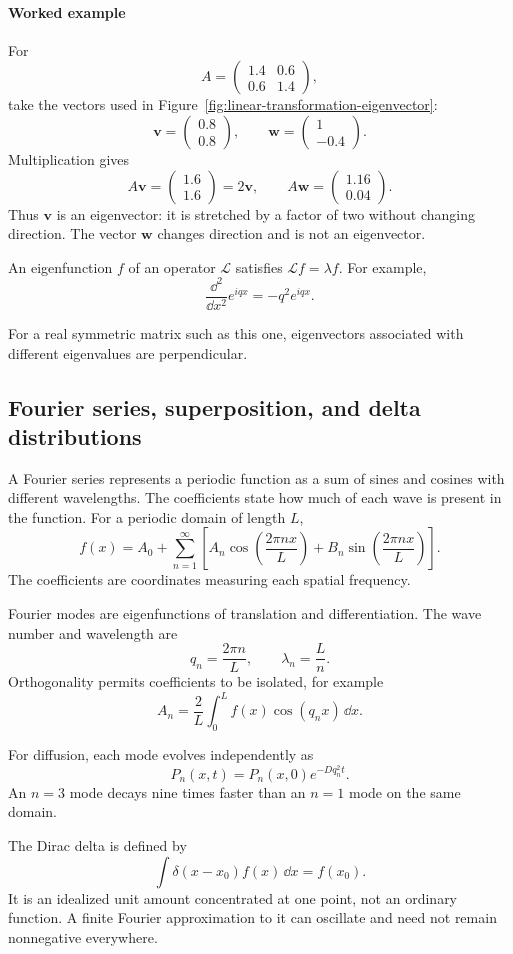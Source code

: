 \paragraph{Worked example}
For
\[
    A=\begin{pmatrix}1.4&0.6\\0.6&1.4\end{pmatrix},
\]
take the vectors used in Figure~\ref{fig:linear-transformation-eigenvector}:
\[
    \mathbf{v}=\begin{pmatrix}0.8\\0.8\end{pmatrix}, \qquad \mathbf{w}=\begin{pmatrix}1\\-0.4\end{pmatrix}.
\]
Multiplication gives
\[
    A\mathbf{v}=\begin{pmatrix}1.6\\1.6\end{pmatrix}=2\mathbf{v}, \qquad A\mathbf{w}=\begin{pmatrix}1.16\\0.04\end{pmatrix}.
\]
Thus $\mathbf{v}$ is an eigenvector: it is stretched by a factor of two without changing direction.
The vector $\mathbf{w}$ changes direction and is not an eigenvector.

An eigenfunction $f$ of an operator $\mathcal{L}$ satisfies $\mathcal{L}f=\lambda f$.
For example,
\[
    \frac{\dd^2}{\dd x^2}e^{iqx}=-q^2e^{iqx}.
\]

For a real symmetric matrix such as this one, eigenvectors associated with different eigenvalues are perpendicular.


\subsection{Fourier series, superposition, and delta distributions}
\label{math:fourier}

A Fourier series represents a periodic function as a sum of sines and cosines with different wavelengths.
The coefficients state how much of each wave is present in the function.
For a periodic domain of length $L$,
\[
    f(x)=A_0+\sum_{n=1}^{\infty}\left[A_n\cos\left(\frac{2\pi nx}{L}\right)+B_n\sin\left(\frac{2\pi nx}{L}\right)\right].
\]
The coefficients are coordinates measuring each spatial frequency.

Fourier modes are eigenfunctions of translation and differentiation.
The wave number and wavelength are
\[
    q_n=\frac{2\pi n}{L}, \qquad \lambda_n=\frac{L}{n}.
\]
Orthogonality permits coefficients to be isolated, for example
\[
    A_n=\frac{2}{L}\int_0^Lf(x)\cos(q_nx)\,\dd x.
\]

For diffusion, each mode evolves independently as
\[
    P_n(x,t)=P_n(x,0)e^{-Dq_n^2t}.
\]
An $n=3$ mode decays nine times faster than an $n=1$ mode on the same domain.

The Dirac delta is defined by
\[
    \int\delta(x-x_0)f(x)\,\dd x=f(x_0).
\]
It is an idealized unit amount concentrated at one point, not an ordinary function.
A finite Fourier approximation to it can oscillate and need not remain nonnegative everywhere.

